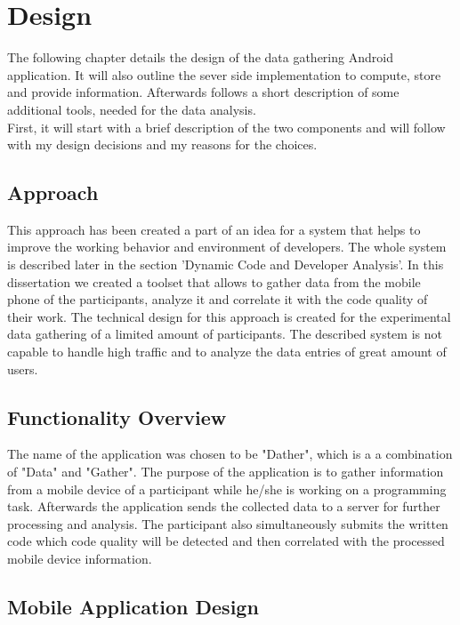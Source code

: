 \chapter{Design}

\begin{flushleft}
The following chapter details the design of the data gathering Android application. It will also outline the sever side implementation to compute, store and provide information. Afterwards follows a short description of some additional tools, needed for the data analysis.\\
First, it will start with a brief description of the two components and will follow with my design decisions and my reasons for the choices. 
\end{flushleft}

\section{Approach}
This approach has been created a part of an idea for a system that helps to improve the working behavior and environment of developers. The whole system is described later in the section 'Dynamic Code and Developer Analysis'.
In this dissertation we created a toolset that allows to gather data from the mobile phone of the participants, analyze it and correlate it with the code quality of their work. The technical design for this approach is created for the experimental data gathering of a limited amount of participants. The described system is not capable to handle high traffic and to analyze the data entries of great amount of users. 

\section{Functionality Overview}
The name of the application was chosen to be "Dather", which is a a combination of "Data" and "Gather".
The purpose of the application is to gather information from a mobile device of a participant while he/she is working on a programming task. Afterwards the application sends the collected data to a server for further processing and analysis. The participant also simultaneously submits the written code which code quality will be detected and then correlated with the processed mobile device information. 

\section{Mobile Application Design}

